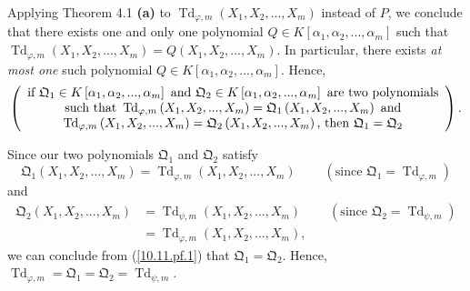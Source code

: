 \documentclass[numbers=enddot,12pt,final,onecolumn,notitlepage]{scrartcl}%
\begin{document}
Applying Theorem 4.1 \textbf{(a)} to $\operatorname*{Td}\nolimits_{\varphi
,m}\left(  X_{1},X_{2},...,X_{m}\right)  $ instead of $P$, we conclude that
there exists one and only one polynomial $Q\in K\left[  \alpha_{1},\alpha
_{2},...,\alpha_{m}\right]  $ such that $\operatorname*{Td}\nolimits_{\varphi
,m}\left(  X_{1},X_{2},...,X_{m}\right)  =Q\left(  X_{1},X_{2},...,X_{m}%
\right)  $. In particular, there exists \textit{at most one} such polynomial
$Q\in K\left[  \alpha_{1},\alpha_{2},...,\alpha_{m}\right]  $. Hence,
\begin{equation}
\left(
\begin{array}
[c]{c}%
\text{if }\mathfrak{Q}_{1}\in K\left[  \alpha_{1},\alpha_{2},...,\alpha
_{m}\right]  \text{ and }\mathfrak{Q}_{2}\in K\left[  \alpha_{1},\alpha
_{2},...,\alpha_{m}\right]  \text{ are two polynomials}\\
\text{such that }\operatorname*{Td}\nolimits_{\varphi,m}\left(  X_{1}%
,X_{2},...,X_{m}\right)  =\mathfrak{Q}_{1}\left(  X_{1},X_{2},...,X_{m}%
\right)  \text{ and}\\
\operatorname*{Td}\nolimits_{\varphi,m}\left(  X_{1},X_{2},...,X_{m}\right)
=\mathfrak{Q}_{2}\left(  X_{1},X_{2},...,X_{m}\right)  \text{, then
}\mathfrak{Q}_{1}=\mathfrak{Q}_{2}%
\end{array}
\right)  . \label{10.11.pf.1}%
\end{equation}


Since our two polynomials $\mathfrak{Q}_{1}$ and $\mathfrak{Q}_{2}$ satisfy%
\[
\mathfrak{Q}_{1}\left(  X_{1},X_{2},...,X_{m}\right)  =\operatorname*{Td}%
\nolimits_{\varphi,m}\left(  X_{1},X_{2},...,X_{m}\right)
\ \ \ \ \ \ \ \ \ \ \left(  \text{since }\mathfrak{Q}_{1}=\operatorname*{Td}%
\nolimits_{\varphi,m}\right)
\]
and%
\begin{align*}
\mathfrak{Q}_{2}\left(  X_{1},X_{2},...,X_{m}\right)   &  =\operatorname*{Td}%
\nolimits_{\psi,m}\left(  X_{1},X_{2},...,X_{m}\right)
\ \ \ \ \ \ \ \ \ \ \left(  \text{since }\mathfrak{Q}_{2}=\operatorname*{Td}%
\nolimits_{\psi,m}\right) \\
&  =\operatorname*{Td}\nolimits_{\varphi,m}\left(  X_{1},X_{2},...,X_{m}%
\right)  ,
\end{align*}
we can conclude from (\ref{10.11.pf.1}) that $\mathfrak{Q}_{1}=\mathfrak{Q}%
_{2}$. Hence, $\operatorname*{Td}\nolimits_{\varphi,m}=\mathfrak{Q}%
_{1}=\mathfrak{Q}_{2}=\operatorname*{Td}\nolimits_{\psi,m}$.
\end{document}
